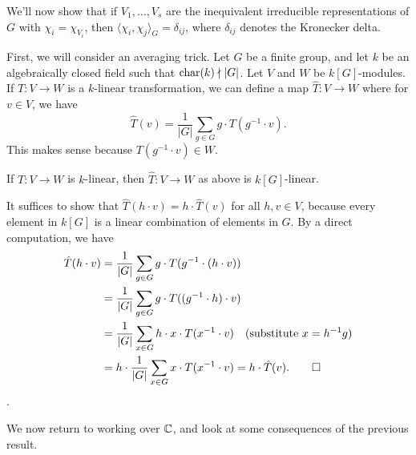 We'll now show that if $V_1, \dots, V_s$ are the inequivalent irreducible 
representations of $G$ with $\chi_i = \chi_{V_i}$, then $\langle \chi_i, 
\chi_j \rangle_G = \delta_{ij}$, where $\delta_{ij}$ denotes the Kronecker delta. 

First, we will consider an averaging trick. Let $G$ be a finite group, and let 
$k$ be an algebraically closed field such that $\operatorname{char}(k) \nmid |G|$. Let 
$V$ and $W$ be $k[G]$-modules. If $T : V \to W$ is a $k$-linear transformation, 
we can define a map $\hat T : V \to W$ where for $v \in V$, we have 
\[ \hat T(v) = \frac1{|G|} \sum_{g \in G} g \cdot T(g^{-1} \cdot v). \] 
This makes sense because $T(g^{-1} \cdot v) \in W$. 

\begin{theo}{}
    If $T : V \to W$ is $k$-linear, then $\hat T : V \to W$ as above is 
    $k[G]$-linear. 
\end{theo}
\begin{pf}
    It suffices to show that $\hat T(h \cdot v) = h \cdot \hat T(v)$ for all 
    $h, v \in V$, because every element in $k[G]$ is a linear combination of 
    elements in $G$. By a direct computation, we have 
    \begin{align*}
        \hat T(h \cdot v) 
        &= \frac1{|G|} \sum_{g\in G} g \cdot T(g^{-1} \cdot (h \cdot v)) \\ 
        &= \frac1{|G|} \sum_{g\in G} g \cdot T((g^{-1} \cdot h) \cdot v) \\ 
        &= \frac1{|G|} \sum_{x\in G} h \cdot x \cdot T(x^{-1} \cdot v) 
        \quad \text{(substitute $x = h^{-1}g$)} \\ 
        &= h \cdot \frac1{|G|} \sum_{x\in G} x \cdot T(x^{-1} \cdot v) 
        = h \cdot \hat T(v). \qedhere 
    \end{align*}. 
\end{pf}

We now return to working over $\mathbb{C}$, and look at some consequences of the previous 
result. 

